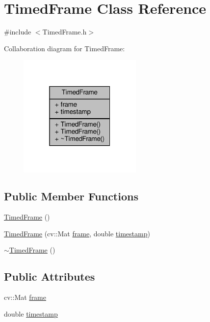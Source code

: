 \hypertarget{class_timed_frame}{}\section{Timed\+Frame Class Reference}
\label{class_timed_frame}


{\ttfamily \#include $<$Timed\+Frame.\+h$>$}



Collaboration diagram for Timed\+Frame\+:\nopagebreak
\begin{figure}[H]
\begin{center}
\leavevmode
\includegraphics[width=172pt]{class_timed_frame__coll__graph}
\end{center}
\end{figure}
\subsection*{Public Member Functions}
\begin{DoxyCompactItemize}
\item 
\hyperlink{class_timed_frame_ab490571187c0ff75b843cc40245990d6}{Timed\+Frame} ()
\item 
\hyperlink{class_timed_frame_aeb70857af8b4f157785c6e0d3fcc8d53}{Timed\+Frame} (cv\+::\+Mat \hyperlink{class_timed_frame_a4c73ac094ec94f9be6558208b4916a36}{frame}, double \hyperlink{class_timed_frame_a126b8150949e1bd734778de55496b90c}{timestamp})
\item 
\hyperlink{class_timed_frame_a4be9ac0c21706f905a503fa035fd2e68}{$\sim$\+Timed\+Frame} ()
\end{DoxyCompactItemize}
\subsection*{Public Attributes}
\begin{DoxyCompactItemize}
\item 
cv\+::\+Mat \hyperlink{class_timed_frame_a4c73ac094ec94f9be6558208b4916a36}{frame}
\item 
double \hyperlink{class_timed_frame_a126b8150949e1bd734778de55496b90c}{timestamp}
\end{DoxyCompactItemize}


